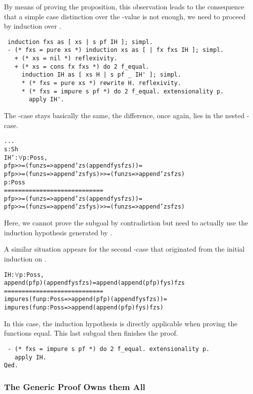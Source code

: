 By means of proving the proposition, this observation leads to the consequence that a simple case distinction over the \--value  is not enough, we need to proceed by induction over .

\begin{verbatim}
 induction fxs as [ xs | s pf IH ]; simpl.
 - (* fxs = pure xs *) induction xs as [ | fx fxs IH ]; simpl.
   + (* xs = nil *) reflexivity.
   + (* xs = cons fx fxs *) do 2 f_equal.
     induction IH as [ xs H | s pf _ IH' ]; simpl.
     * (* fxs = pure xs *) rewrite H. reflexivity.
     * (* fxs = impure s pf *) do 2 f_equal. extensionality p.
       apply IH'.
\end{verbatim}

The \--case stays basically the same, the difference, once again, lies in the nested \--case.

\begin{alltt}
  ...
  s : Sh
  IH' : \(\forall\) p : Pos s,
        pf p >>= (fun zs => append' zs (append fys fzs)) =
        pf p >>= (fun zs => append' zs fys) >>= (fun zs => append' zs fzs)
  p : Pos s
  ============================
  pf p >>= (fun zs => append' zs (append fys fzs)) =
  pf p >>= (fun zs => append' zs fys) >>= (fun zs => append' zs fzs)
\end{alltt}

Here, we cannot prove the subgoal by contradiction but need to actually use the induction hypothesis  generated by .

A similar situation appears for the second \--case that originated from the initial induction on .
\begin{alltt}
  IH : \(\forall\) p : Pos s,
       append (pf p) (append fys fzs) = append (append (pf p) fys) fzs
  ============================
  impure s (fun p : Pos s => append (pf p) (append fys fzs)) =
  impure s (fun p : Pos s => append (append (pf p) fys) fzs)
\end{alltt}

In this case, the induction hypothesis is directly applicable when proving the functions equal.
This last subgoal then finishes the proof.

\begin{verbatim}
 - (* fxs = impure s pf *) do 2 f_equal. extensionality p.
   apply IH.
Qed.
\end{verbatim}

\subsubsection{The Generic Proof Owns them All}

